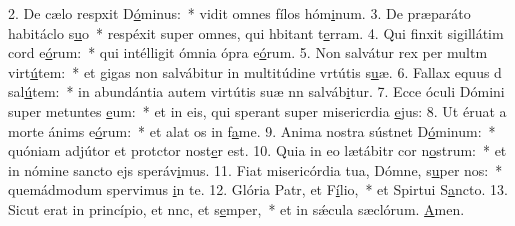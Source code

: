 2. De cælo respxit D\uline{ó}minus:~* vidit omnes fílos hóm\uline{i}num.
3. De præparáto habitáclo s\uline{u}o~* respéxit super omnes, qui hbitant t\uline{e}rram.
4. Qui finxit sigillátim cord e\uline{ó}rum:~* qui intélligit ómnia ópra e\uline{ó}rum.
5. Non salvátur rex per multm virt\uline{ú}tem:~* et gigas non salvábitur in multitúdine vrtútis s\uline{u}æ.
6. Fallax equus d sal\uline{ú}tem:~* in abundántia autem virtútis suæ nn salváb\uline{i}tur.
7. Ecce óculi Dómini super metuntes \uline{e}um:~* et in eis, qui sperant super misericrdia \uline{e}jus:
8. Ut éruat a morte ánims e\uline{ó}rum:~* et alat os in f\uline{a}me.
9. Anima nostra sústnet D\uline{ó}minum:~* quóniam adjútor et protctor nost\uline{e}r est.
10. Quia in eo lætábitr cor n\uline{o}strum:~* et in nómine sancto ejs speráv\uline{i}mus.
11. Fiat misericórdia tua, Dómne, s\uline{u}per nos:~* quemádmodum spervimus \uline{i}n te.
12. Glória Patr, et F\uline{í}lio,~* et Spirtui S\uline{a}ncto.
13. Sicut erat in princípio, et nnc, et s\uline{e}mper,~* et in sǽcula sæclórum. \uline{A}men.

